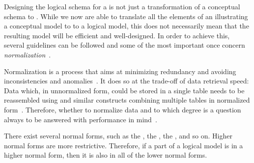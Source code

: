 %
\label{sec:db:normalization}%
%
Designing the logical schema for a  is not just a transformation of a conceptual schema to \sql.
While we now are able to translate all the elements of an  illustrating a conceptual model to to a logical model, this does not necessarily mean that the resulting model will be efficient and well-designed.
In order to achieve this, several guidelines can be followed and some of the most important once concern \emph{normalization}~\cite{D2003AITDS,EN2015FODS}.

Normalization is a process that aims at minimizing redundancy and avoiding inconsistencies and anomalies~\cite{S2024D:N,S2024D:RNDAFDNF}.
It does so at the trade-off of data retrieval speed:
Data which, in unnormalized form, could be stored in a single table needs to be reassembled using  and similar constructs combining multiple tables in normalized form~\cite{K1983ASGTFNFIRDT}.
Therefore, whether to normalize data and to which degree is a question always to be answered with performance in mind~\cite{K1983ASGTFNFIRDT}.

There exist several normal forms, such as the , the , the , and so on.
Higher normal forms are more restrictive.
Therefore, if a part of a logical model is in a higher normal form, then it is also in all of the lower normal forms.
%
%
%
\endhsection%
%
